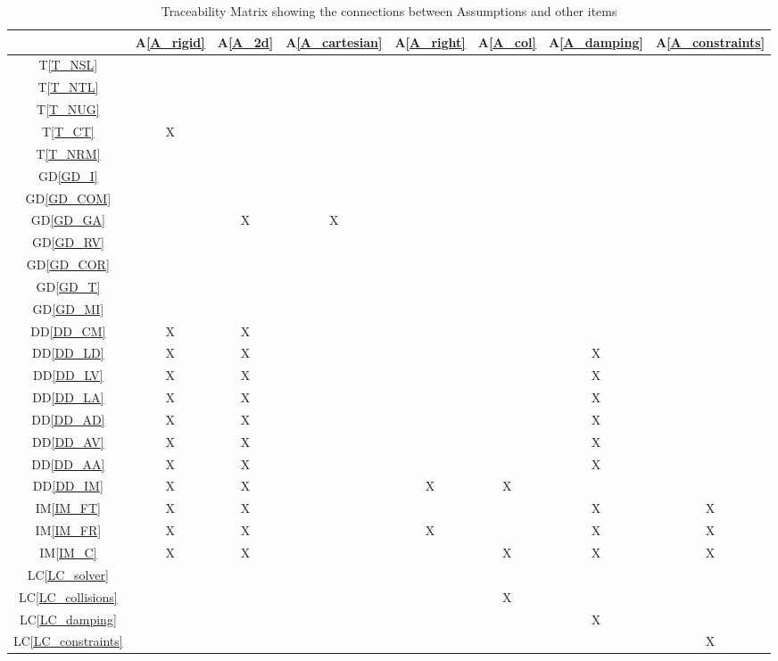 \documentclass[12pt]{article}
\newcommand{\dref}[1]{GD\ref{#1}}
\newcommand{\ddref}[1]{DD\ref{#1}}
\newcommand{\tref}[1]{T\ref{#1}}
\newcommand{\aref}[1]{A\ref{#1}}
\newcommand{\iref}[1]{IM\ref{#1}}
\newcommand{\lcref}[1]{LC\ref{#1}}
\begin{document}
\renewcommand*{\thetable}{4}
\begin{table}[h!]
\renewcommand*{\arraystretch}{1.2}
\centering
\begin{tabular}{|c|c|c|c|c|c|c|c|}
\hline 
& \aref{A_rigid} & \aref{A_2d} & \aref{A_cartesian} & \aref{A_right} & \aref{A_col} & \aref{A_damping} & \aref{A_constraints} \\ \hline
\tref{T_NSL} 			& & & & & & & \\ \hline
\tref{T_NTL} 			& & & & & & & \\ \hline
\tref{T_NUG} 			& & & & & & & \\ \hline
\tref{T_CT} 			&X& & & & & & \\ \hline
\tref{T_NRM} 			& & & & & & & \\ \hline
\dref{GD_I} 			& & & & & & & \\ \hline
\dref{GD_COM} 			& & & & & & & \\ \hline
\dref{GD_GA} 			& &X&X& & & & \\ \hline
\dref{GD_RV} 			& & & & & & & \\ \hline
\dref{GD_COR} 			& & & & & & & \\ \hline
\dref{GD_T} 			& & & & & & & \\ \hline
\dref{GD_MI} 			& & & & & & & \\ \hline
\ddref{DD_CM} 			&X&X& & & & & \\ \hline
\ddref{DD_LD} 			&X&X& & & &X& \\ \hline
\ddref{DD_LV} 			&X&X& & & &X& \\ \hline
\ddref{DD_LA} 			&X&X& & & &X& \\ \hline
\ddref{DD_AD} 			&X&X& & & &X& \\ \hline
\ddref{DD_AV} 			&X&X& & & &X& \\ \hline
\ddref{DD_AA} 			&X&X& & & &X& \\ \hline
\ddref{DD_IM} 			&X&X& &X&X& & \\ \hline
\iref{IM_FT} 			&X&X& & & &X&X\\ \hline
\iref{IM_FR} 			&X&X& &X& &X&X\\ \hline
\iref{IM_C} 			&X&X& & &X&X&X\\ \hline
\lcref{LC_solver}		& & & & & & & \\ \hline
\lcref{LC_collisions}	& & & & &X& & \\ \hline
\lcref{LC_damping}		& & & & & &X& \\ \hline
\lcref{LC_constraints}	& & & & & & &X \\ \hline
\end{tabular}
\bigskip
\caption{Traceability Matrix showing the connections between Assumptions and other items} \label{ATraceMatrix}
\end{table}
\end{document}
